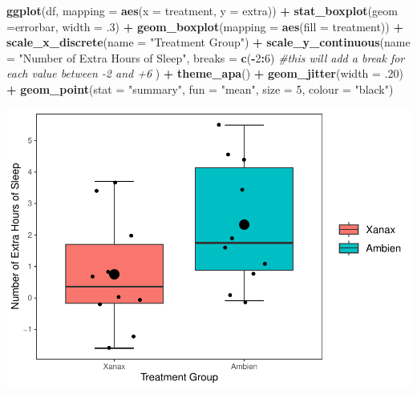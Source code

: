 \documentclass[
]{book}
\newenvironment{Shaded}{\begin{snugshade}}{\end{snugshade}}
\newcommand{\AttributeTok}[1]{\textcolor[rgb]{0.13,0.29,0.53}{#1}}
\newcommand{\CommentTok}[1]{\textcolor[rgb]{0.56,0.35,0.01}{\textit{#1}}}
\newcommand{\DecValTok}[1]{\textcolor[rgb]{0.00,0.00,0.81}{#1}}
\newcommand{\FunctionTok}[1]{\textcolor[rgb]{0.13,0.29,0.53}{\textbf{#1}}}
\newcommand{\NormalTok}[1]{#1}
\newcommand{\SpecialCharTok}[1]{\textcolor[rgb]{0.81,0.36,0.00}{\textbf{#1}}}
\newcommand{\StringTok}[1]{\textcolor[rgb]{0.31,0.60,0.02}{#1}}
\begin{document}
\begin{Shaded}
\begin{Highlighting}[]
\FunctionTok{ggplot}\NormalTok{(df, }\AttributeTok{mapping =} \FunctionTok{aes}\NormalTok{(}\AttributeTok{x =}\NormalTok{ treatment, }\AttributeTok{y =}\NormalTok{ extra)) }\SpecialCharTok{+} 
  \FunctionTok{stat\_boxplot}\NormalTok{(}\AttributeTok{geom =}\StringTok{\textquotesingle{}errorbar\textquotesingle{}}\NormalTok{, }\AttributeTok{width =}\NormalTok{ .}\DecValTok{3}\NormalTok{) }\SpecialCharTok{+}
  \FunctionTok{geom\_boxplot}\NormalTok{(}\AttributeTok{mapping =} \FunctionTok{aes}\NormalTok{(}\AttributeTok{fill =}\NormalTok{ treatment)) }\SpecialCharTok{+} 
  \FunctionTok{scale\_x\_discrete}\NormalTok{(}\AttributeTok{name =} \StringTok{"Treatment Group"}\NormalTok{) }\SpecialCharTok{+} 
  \FunctionTok{scale\_y\_continuous}\NormalTok{(}\AttributeTok{name =} \StringTok{"Number of Extra Hours of Sleep"}\NormalTok{, }
                     \AttributeTok{breaks =} \FunctionTok{c}\NormalTok{(}\SpecialCharTok{{-}}\DecValTok{2}\SpecialCharTok{:}\DecValTok{6}\NormalTok{) }\CommentTok{\#this will add a break for each value between {-}2 and +6}
\NormalTok{                     ) }\SpecialCharTok{+}
  \FunctionTok{theme\_apa}\NormalTok{() }\SpecialCharTok{+}
  \FunctionTok{geom\_jitter}\NormalTok{(}\AttributeTok{width =}\NormalTok{ .}\DecValTok{20}\NormalTok{) }\SpecialCharTok{+}
  \FunctionTok{geom\_point}\NormalTok{(}\AttributeTok{stat =} \StringTok{"summary"}\NormalTok{, }\AttributeTok{fun =} \StringTok{"mean"}\NormalTok{, }\AttributeTok{size =} \DecValTok{5}\NormalTok{, }\AttributeTok{colour =} \StringTok{"black"}\NormalTok{) }
\end{Highlighting}
\end{Shaded}

\includegraphics{rintro_demo_files/figure-latex/unnamed-chunk-303-1.pdf}
\end{document}
